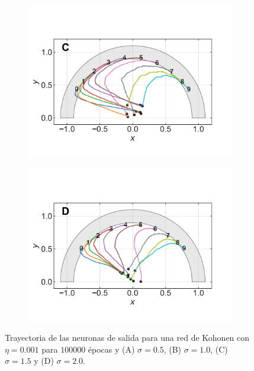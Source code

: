 \documentclass[11pt,twocolumn,twoside]{opticajnl}
\begin{document}
\begin{figure}[H]
\begin{subfigure}[b]{0.49\linewidth}
            \includegraphics[width=1.1\textwidth]{Figuras/pesos_sigma_1.5_epochs_100000_lr_0.001.pdf}
         \end{subfigure}
         \begin{subfigure}[b]{0.49\linewidth}
            \centering
            \includegraphics[width=1.1\textwidth]{Figuras/pesos_sigma_2_epochs_100000_lr_0.001.pdf}
         \end{subfigure}
    \caption{Trayectoria de las neuronas de salida para una red de Kohonen con $\eta=0.001$ para $100000$ épocas y (A) $\sigma=0.5$, (B) $\sigma=1.0$, (C) $\sigma=1.5$ y (D) $\sigma=2.0$.} 
    \label{fig:Kohonen_sigma}
\end{figure}
\end{document}
